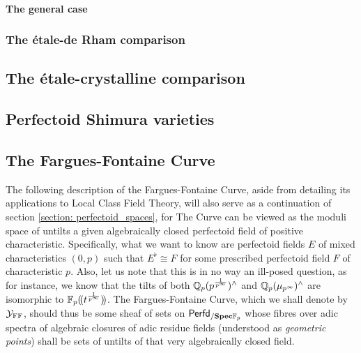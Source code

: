                 \paragraph{The general case}
            
            \subsubsection{The \'etale-de Rham comparison}
        
        \subsection{The \'etale-crystalline comparison}
        
        \subsection{Perfectoid Shimura varieties}
        
        \subsection{The Fargues-Fontaine Curve}
            The following description of the Fargues-Fontaine Curve, aside from detailing its applications to Local Class Field Theory, will also serve as a continuation of section \ref{section: perfectoid_spaces}, for The Curve can be viewed as the moduli space of untilts a given algebraically closed perfectoid field of positive characteristic. Specifically, what we want to know are perfectoid fields $E$ of mixed characteristics $(0, p)$ such that $E^{\flat} \cong F$ for some prescribed perfectoid field $F$ of characteristic $p$. Also, let us note that this is in no way an ill-posed question, as for instance, we know that the tilts of both $\mathbb{Q}_p(p^{\frac{1}{p^{\infty}}})^{\wedge}$ and $\mathbb{Q}_p(\mu_{p^{\infty}})^{\wedge}$ are isomorphic to $\mathbb{F}_p(\!(t^{\frac{1}{p^{\infty}}})\!)$. The Fargues-Fontaine Curve, which we shall denote by $\mathcal{Y}_{\mathrm{FF}}$, should thus be some sheaf of sets on $\mathsf{Perfd}_{/\mathbf{Spec} \mathbb{F}_p}$ whose fibres over adic spectra of algebraic closures of adic residue fields (understood as \textit{geometric points}) shall be sets of untilts of that very algebraically closed field.
            
